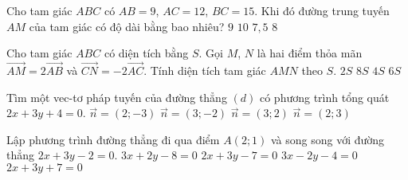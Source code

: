 \begin{ex}%
	Cho tam giác $ABC$ có $AB=9$, $AC=12$, $BC=15$. Khi đó đường trung tuyến $AM$ của tam giác có độ dài bằng bao nhiêu?
	\choice
	{$9$}
	{$10$}
	{\True $7{,}5$}
	{$8$}
\end{ex}
\begin{ex}%
	Cho tam giác $ABC$ có diện tích bằng $S$. Gọi $M$, $N$ là hai điểm thỏa mãn $\vec{AM}=2\vec{AB}$ và $\vec{CN}=-2\vec{AC}$. Tính diện tích tam giác $AMN$ theo $S$.
	\choice
	{\True $2S$}
	{$8S$}
	{$4S$}
	{$6S$}
\end{ex}
\begin{ex}%
	Tìm một vec-tơ pháp tuyến của đường thẳng $(d)$ có phương trình tổng quát $2x+3y+4=0$.
	\choice
	{$\vec{n}=(2;-3)$}
	{$\vec{n}=(3;-2)$}
	{$\vec{n}=(3;2)$}
	{\True $\vec{n}=(2;3)$}
\end{ex}
\begin{ex}%
	Lập phương trình đường thẳng đi qua điểm $A(2;1)$ và song song với đường thẳng $2x+3y-2=0$.
	\choice
	{$3x+2y-8=0$}
	{\True $2x+3y-7=0$}
	{$3x-2y-4=0$}
	{$2x+3y+7=0$}
\end{ex}
